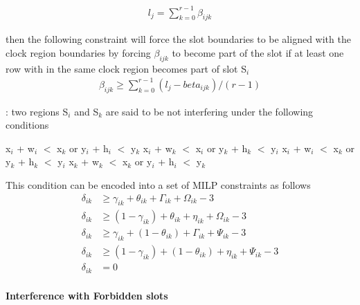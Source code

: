 \documentclass[conference]{IEEEtran}
\begin{document}
\begin{equation}
\begin{split}
l_j = \sum_{k=0}^{r-1} \beta_{ijk}
\end{split}
\end{equation}

then the following constraint will force the slot boundaries to be aligned with the clock region boundaries by forcing $\beta_{ijk}$ to become part of the slot if at least one row with in the same clock region becomes part of slot S$_i$
\begin{equation}
\begin{split}
\beta_{ijk} \geq \sum_{k=0}^{r-1}  (l_j - beta_{ijk}) / (r - 1)
\end{split}
\end{equation}

\begin{constraint}: two regions S$_i$ and S$_k$ are said to be not interfering under the following conditions
\begin{algorithmic}
	\STATE x$_i$ + w$_i$ $<$ x$_k$ or y$_i$ + h$_i$ $<$ y$_k$
	\STATE x$_i$ + w$_k$ $<$ x$_i$ or y$_k$ + h$_k$ $<$ y$_i$
	\STATE x$_i$ + w$_i$ $<$ x$_k$ or y$_k$ + h$_k$ $<$ y$_i$
\ELSE
	\STATE x$_k$ + w$_k$ $<$ x$_k$ or y$_i$ + h$_i$ $<$ y$_k$
\ENDIF
\end{algorithmic}
\end{constraint}

This condition can be encoded into a set of MILP constraints as follows \\
\begin{equation}
\begin{split}
\delta_{ik} & \geq \gamma_{ik} + \theta_{ik} + \Gamma_{ik} + \Omega_{ik} - 3 \\
\delta_{ik} & \geq (1 - \gamma_{ik}) + \theta_{ik} + \eta_{ik} + \Omega_{ik} - 3 \\
\delta_{ik} & \geq \gamma_{ik} +(1 - \theta_{ik}) + \Gamma_{ik} + \Psi_{ik} - 3 \\
\delta_{ik} & \geq (1 - \gamma_{ik}) + (1 - \theta_{ik}) + \eta_{ik} + \Psi_{ik} - 3 \\
\delta_{ik} & = 0 \\
\end{split}
\end{equation}

\textbf{Interference with Forbidden slots}
\end{document}

